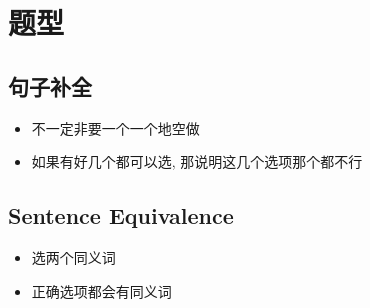 \chapter{题型}

\section{句子补全}

  \begin{itemize}
    \item 不一定非要一个一个地空做
    \item 如果有好几个都可以选, 那说明这几个选项那个都不行
  \end{itemize}

\section{Sentence Equivalence}

  \begin{itemize}
    \item 选两个同义词
    \item 正确选项都会有同义词
  \end{itemize}

